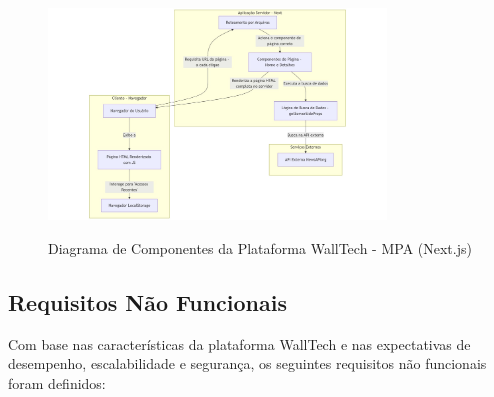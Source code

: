 \begin{figure}[H]
  \centering
  \caption{Diagrama de Componentes da Plataforma WallTech - MPA (Next.js)}
  \includegraphics[width=0.8\textwidth]{media/component-diagram-next.jpeg}
  \label{fig:component-diagram-next}
\end{figure}


\subsection{Requisitos Não Funcionais}
\label{subsec:requisitos-nao-funcionais}
Com base nas características da plataforma WallTech e nas expectativas de desempenho, escalabilidade e segurança, os seguintes requisitos não funcionais foram definidos:

